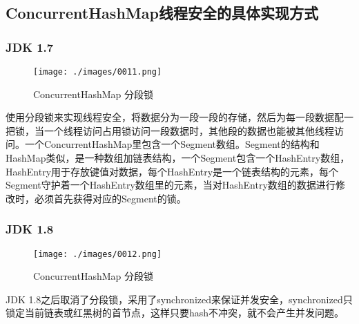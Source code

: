 \subsection{ConcurrentHashMap线程安全的具体实现方式}
\subsubsection{JDK 1.7}
\begin{figure}[H]
    \centering
    \texttt{[image: ./images/0011.png]}
    \caption{ConcurrentHashMap 分段锁}
\end{figure}
使用分段锁来实现线程安全，将数据分为一段一段的存储，然后为每一段数据配一把锁，当一个线程访问占用锁访问一段数据时，其他段的数据也能被其他线程访问。一个ConcurrentHashMap里包含一个Segment数组。Segment的结构和HashMap类似，是一种数组加链表结构，一个Segment包含一个HashEntry数组，HashEntry用于存放键值对数据，每个HashEntry是一个链表结构的元素，每个Segment守护着一个HashEntry数组里的元素，当对HashEntry数组的数据进行修改时，必须首先获得对应的Segment的锁。
\subsubsection{JDK 1.8}
\begin{figure}[H]
    \centering
    \texttt{[image: ./images/0012.png]}
    \caption{ConcurrentHashMap 分段锁}
\end{figure}
JDK 1.8之后取消了分段锁，采用了synchronized来保证并发安全，synchronized只锁定当前链表或红黑树的首节点，这样只要hash不冲突，就不会产生并发问题。
